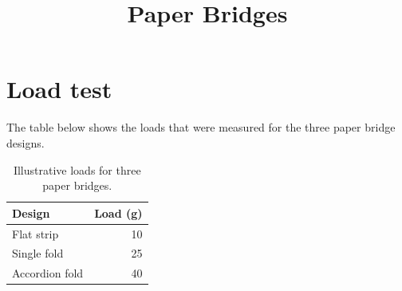 \documentclass[11pt]{article}
\title{Paper Bridges}
\author{}
\date{}
\begin{document}
\maketitle

\section*{Load test}
The table below shows the loads that were measured for the three paper bridge designs.

\begin{table}[ht]
\centering
\renewcommand{\arraystretch}{1.25}
\begin{tabular}{lr}
\toprule
Design & Load (g) \\
\midrule
Flat strip & 10 \\
Single fold & 25 \\
Accordion fold & 40 \\
\bottomrule
\end{tabular}
\caption{Illustrative loads for three paper bridges.}
\label{tab:load}
\end{table}
\end{document}

